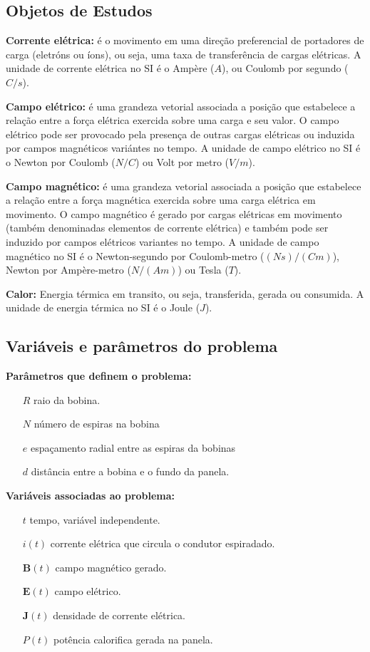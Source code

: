 \documentclass[
	article,			%
	11pt,				%
	oneside,			%
	a4paper,			%
	english,			%
	brazil,				%
	sumario=tradicional
	]{abntex2}
\begin{document}
\subsection{Objetos de Estudos}

\textbf{Corrente elétrica:} é o movimento em uma direção preferencial de portadores de carga (eletróns ou íons), ou seja, uma taxa de transferência de cargas elétricas. A unidade de corrente elétrica no SI é o Ampère ($ A $), ou Coulomb por segundo ($ C/s $).

\textbf{Campo elétrico:} é uma grandeza vetorial associada a posição que estabelece a relação entre a força elétrica exercida sobre uma carga e seu valor. O campo elétrico pode ser provocado pela presença de outras cargas elétricas ou induzida por campos magnéticos variántes no tempo. A unidade de campo elétrico no SI é o Newton por Coulomb ($ N/C $) ou Volt por metro ($ V/m $).

\textbf{Campo magnético:} é uma grandeza vetorial associada a posição que estabelece a relação entre a força magnética exercida sobre uma carga elétrica em movimento. O campo magnético é gerado por cargas elétricas em movimento (também denominadas elementos de corrente elétrica) e também pode ser induzido por campos elétricos variantes no tempo. A unidade de campo magnético no SI é o Newton-segundo por Coulomb-metro ($ (Ns)/(Cm) $), Newton por Ampère-metro ($ N/(Am) $) ou Tesla ($ T $).

\textbf{Calor:} Energia térmica em transito, ou seja, transferida, gerada ou consumida. A unidade de energia térmica no SI é o Joule ($ J $).

\subsection{Variáveis e parâmetros do problema}

\textbf{Parâmetros que definem o problema:}

\begin{itemize}
	\item[$ R $] raio da bobina.
	\item[$ N $] número de espiras na bobina
	\item[$ e $] espaçamento radial entre as espiras da bobinas
	\item[$ d $] distância entre a bobina e o fundo da panela.
\end{itemize}

\textbf{Variáveis associadas ao problema:}

\begin{itemize}
	\item[$ t $] tempo, variável independente.
	\item[$ i(t) $] corrente elétrica que circula o condutor espiradado.
	\item[$ \textbf{B}(t) $] campo magnético gerado.
	\item[$ \textbf{E}(t) $] campo elétrico.
	\item[$ \textbf{J}(t) $] densidade de corrente elétrica.
	\item[$ P(t) $] potência calorifica gerada na panela.
\end{itemize}
\end{document}
